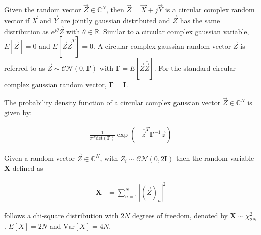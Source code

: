 \documentclass[a4paper, openany, oneside]{memoir}
\begin{document}
\begin{blockDefinition}
Given the random vector $\vec{Z} \in \mathbb{C}^N$, then $\vec{Z} = \vec{X} + j\vec{Y}$ is a circular complex random vector if $\vec{X}$ and $\vec{Y}$ are jointly gaussian distributed and $\vec{Z}$ has the same distribution as $e^{j\theta}\vec{Z}$ with $\theta \in \mathbb{R}$. Similar to a circular complex gaussian variable, $E\left[\vec{Z}\right] = 0$
and $E\left[\vec{Z}\vec{Z}^T\right] = 0$. A circular complex gaussian random vector $\vec{Z}$ is referred to as $\vec{Z} \sim \mathcal{CN}(0,\mathbf{\Gamma})$ with $\mathbf{\Gamma} = E\left[\vec{Z}\overline{\vec{Z}} \right]$. For the standard circular complex gaussian random vector, $\mathbf{\Gamma} = \mathbf{I}$. 

The probability density function of a circular complex gaussian vector $\vec{Z}\in \mathbb{C}^N$ is given by:

\begin{align*}
	\frac{1}{\pi^N \text{det}(\mathbf{\Gamma})} \exp \left(-\overline{\vec{z}}^T \mathbf{\Gamma}^{-1}\vec{z}\right)
\end{align*}
\end{blockDefinition}

\begin{blockDefinition}
Given a random vector $\vec{Z} \in \mathbb{C}^N$, with $Z_i \sim \mathcal{CN}(0, 2\mathbf{I})$ then the random variable $\mathbf{X}$ defined as

\begin{align*}
	\mathbf{X} &= \sum_{n=1}^N \left|(\vec{Z})_n\right|^2 %
\end{align*}






follows a chi-square distribution with $2N$ degrees of freedom, denoted by $\mathbf{X} \sim \chi^2_{2N}$.
$E[X] = 2N$ and $\text{Var}[X] = 4N$.
\end{blockDefinition}
\end{document}
